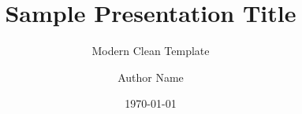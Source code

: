 \documentclass[aspectratio=169,11pt]{beamer}
\title{Sample Presentation Title}
\subtitle{Modern Clean Template}
\author{Author Name}
\institute{Institution / University}
\date{\today}
\begin{document}
\begin{frame}[plain]
  \titlepage
\end{frame}

\end{document}
